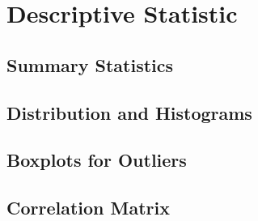 \section{Descriptive Statistic}

\subsection{Summary Statistics}

\subsection{Distribution and Histograms}

\subsection{Boxplots for Outliers}

\subsection{Correlation Matrix}

\newpage